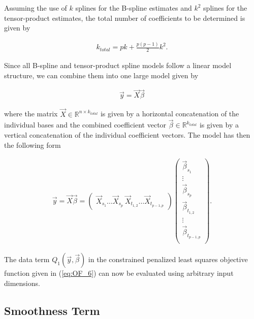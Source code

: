 \documentclass[10pt,a4paper]{article}
\begin{document}
	
	Assuming the use of $k$ splines for the B-spline estimates and $k^2$ splines for the tensor-product estimates, the total number of coefficients to be determined is given by 
	
	\begin{align}\label{eq:tps_total_number_of_coef}
		k_{total} = pk + \frac{p(p-1)}{2}k^2. 
	\end{align}
	
	Since all B-spline and tensor-product spline models follow a linear model structure, we can combine them into one large model given by
	
	\begin{align}\label{eq:tps_lin_mod}
		\vec{y} = \vec{X} \vec{\beta}
	\end{align}
		
	where the matrix $\vec{X} \in \mathbb{R}^{n \times k_{total}}$ is given by a horizontal concatenation of the individual bases and the combined coefficient vector $\vec{\beta} \in \mathbb{R}^{k_{total}}$ is given by a vertical concatenation of the individual coefficient vectors. The model has then the following form
		
	\begin{align}\label{eq:tps_lin_model_verbose}
		\vec{y} = \vec{X} \vec{\beta} = 
					\begin{pmatrix} \vec{X}_{s_1} \dots \vec{X}_{s_p} \ \vec{X}_{t_{1,2}} \dots \vec{X}_{t_{p-1,p}} \end{pmatrix} 
					\begin{pmatrix} \vec{\beta}_{s_1} \\ 
									\vdots  \\ 
									\vec{\beta}_{s_p} \\ 
									\vec{\beta}_{t_{1,2}} \\ 
									\vdots \\ 
									\vec{\beta}_{t_{p-1,p}} \\
					\end{pmatrix}.
	\end{align}
	
	The data term $Q_1(\vec{y}, \vec{\beta})$ in the constrained penalized least squares objective function given in (\ref{eq:OF_6}) can now be evaluated using arbitrary input dimensions. 

	\subsection{Smoothness Term}
	
\end{document}
